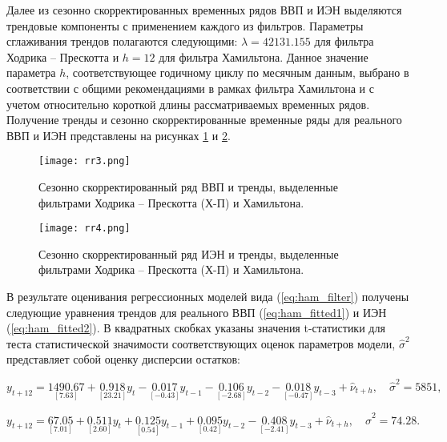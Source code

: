 \documentclass[a4paper,14pt]{extreport}
\begin{document}
	Далее из сезонно скорректированных временных рядов ВВП и ИЭН выделяются трендовые компоненты с применением каждого из фильтров. Параметры сглаживания трендов полагаются следующими: $\lambda=42131.155$ для фильтра Ходрика – Прескотта \cite{esiMakingAlt} и $h=12$ для фильтра Хамильтона. Данное значение параметра $h$, соответствующее годичному циклу по месячным данным, выбрано в соответствии с общими рекомендациями в рамках фильтра Хамильтона и с учетом относительно короткой длины рассматриваемых временных рядов. Получение тренды и сезонно скорректированные временные ряды для реального ВВП и ИЭН представлены на рисунках \ref{fig:rr3} и \ref{fig:rr4}.
	
	\begin{figure}
		\label{fig:rr3}
		\texttt{[image: rr3.png]}
		\caption{
			Сезонно скорректированный ряд ВВП и тренды, 
			выделенные фильтрами Ходрика – Прескотта (Х-П) и Хамильтона. 
		}
	\end{figure}	

	\begin{figure}
		\label{fig:rr4}
		\texttt{[image: rr4.png]}
		\caption{
			Сезонно скорректированный ряд ИЭН и тренды, 
			выделенные фильтрами Ходрика – Прескотта (Х-П) и Хамильтона.
		}
	\end{figure}	

	В результате оценивания регрессионных моделей вида (\ref{eq:ham_filter}) получены следующие уравнения трендов для реального ВВП (\ref{eq:ham_fitted1}) и ИЭН (\ref{eq:ham_fitted2}). В квадратных скобках указаны значения t-статистики для теста статистической значимости соответствующих оценок параметров модели, $\hat{\sigma}^2$ представляет собой оценку дисперсии остатков:

	
	\begin{equation}
		y_{t+12} = \underset{[7.63]}{1490.67} 
		+ \underset{[23.21]}{0.918} y_{t}
		- \underset{[-0.43]}{0.017} y_{t-1}
		- \underset{[-2.68]}{0.106} y_{t-2}
		- \underset{[-0.47]}{0.018} y_{t-3}
		+ \hat{\nu}_{t+h}, \quad \hat{\sigma}^2=5851 ,
		\label{eq:ham_fitted1}
	\end{equation}
	
	\begin{equation}
		y_{t+12} = \underset{[7.01]}{67.05} 
		+ \underset{[2.60]}{0.511} y_{t}
		+ \underset{[0.54]}{0.125} y_{t-1}
		+ \underset{[0.42]}{0.095} y_{t-2}
		- \underset{[-2.41]}{0.408} y_{t-3}
		+ \hat{\nu}_{t+h}, \quad \hat{\sigma}^2=74.28 .
		\label{eq:ham_fitted2}
	\end{equation}
	
\end{document}
